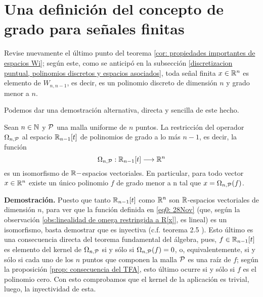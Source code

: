 \section{Una definición del concepto de grado para señales finitas}
\label{definicion del concepto de grado para seniales finitas}

Revise nuevamente el último punto del teorema
\ref{cor: propiedades importantes de espacios Wi}; según este,
como se anticipó en la subsección 
\ref{discretizacion puntual, polinomios discretos y espacios asociados},
toda señal finita $x \in \mathbb{R}^{n}$
es elemento de $W_{n,n-1}$,
es decir, es un polinomio discreto
de dimensión $n$ y grado menor a $n$.

Podemos dar una demostración
alternativa,
directa y sencilla de este hecho.

\begin{prop}
\label{prop: el operador de discretizacion puntual es un isomorfismo (...)}
Sean $n \in \mathbb{N}$ y $\mathcal{P}$ 
una malla uniforme de $n$
puntos. 
La restricción del operador $\Omega_{n, \mathcal{P}}$
al espacio $\mathbb{R}_{n-1}[t]$ de polinomios de grado a lo más
$n-1$, es decir, la función 
\begin{equation}
\label{eq0: 28Nov}
\Omega_{n, \mathcal{P}}:
\mathbb{R}_{n-1}[t] \longrightarrow \mathbb{R}^{n}
\end{equation}
es un isomorfismo de $\mathbb{R}-$espacios vectoriales.
En particular, para todo vector $x \in \mathbb{R}^{n}$
existe un único polinomio $f$ de grado menor a n
tal que $x = \Omega_{n, \mathcal{P}}(f)$.
\end{prop}
\noindent
\textbf{Demostración.}
Puesto que tanto $\mathbb{R}_{n-1}[t]$
como $\mathbb{R}^{n}$ son $\mathbb{R}$-espacios vectoriales
de dimensión $n$, para ver que la función 
definida en
\eqref{eq0: 28Nov} (que, según la observación 
\ref{obs:linealidad de omega restringida a R[x]}, es lineal)
es un isomorfismo, basta
demostrar que es inyectiva 
(c.f. teorema 2.5 \cite{friedberg}).
Esto último es una consecuencia directa del 
teorema fundamental del álgebra,
pues, 
$f \in \mathbb{R}_{n-1}[t]$
es elemento del kernel
de $\Omega_{n, \mathcal{P}}$ si y sólo si 
$\Omega_{n, \mathcal{P}}(f)=0$, o, equivalentemente,
si y sólo si 
cada uno de los $n$ puntos que componen la
malla $\mathcal{P}$ es una raíz de $f$;
según la proposición
\ref{prop: consecuencia del TFA},
esto último ocurre si y sólo si $f$ es el polinomio cero.
Con esto comprobamos que el kernel de la aplicación
\label{eq1: 25Nov} es trivial, luego, la inyectividad
de esta.
\QEDB
\vspace{0.2cm}

